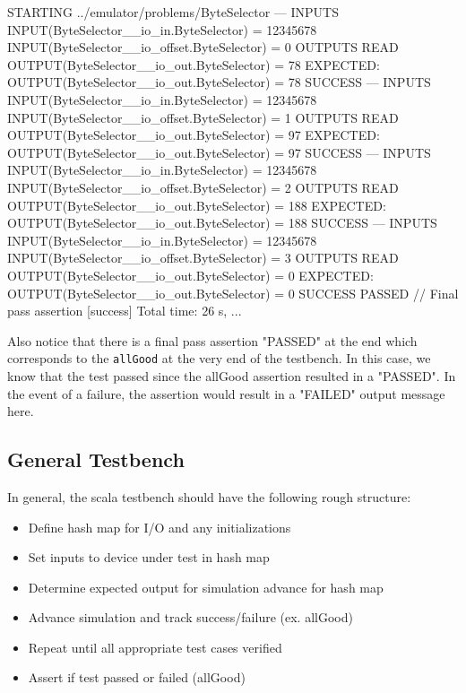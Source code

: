 \documentclass[twocolumn, 10pt]{article}
\begin{document}
\begin{bash}
STARTING ../emulator/problems/ByteSelector
---
INPUTS
  INPUT(ByteSelector__io_in.ByteSelector) = 12345678
  INPUT(ByteSelector__io_offset.ByteSelector) = 0
OUTPUTS
  READ OUTPUT(ByteSelector__io_out.ByteSelector) = 78
  EXPECTED: OUTPUT(ByteSelector__io_out.ByteSelector) = 78
  SUCCESS
---
INPUTS
  INPUT(ByteSelector__io_in.ByteSelector) = 12345678
  INPUT(ByteSelector__io_offset.ByteSelector) = 1
OUTPUTS
  READ OUTPUT(ByteSelector__io_out.ByteSelector) = 97
  EXPECTED: OUTPUT(ByteSelector__io_out.ByteSelector) = 97
  SUCCESS
---
INPUTS
  INPUT(ByteSelector__io_in.ByteSelector) = 12345678
  INPUT(ByteSelector__io_offset.ByteSelector) = 2
OUTPUTS
  READ OUTPUT(ByteSelector__io_out.ByteSelector) = 188
  EXPECTED: OUTPUT(ByteSelector__io_out.ByteSelector) = 188
  SUCCESS
---
INPUTS
  INPUT(ByteSelector__io_in.ByteSelector) = 12345678
  INPUT(ByteSelector__io_offset.ByteSelector) = 3
OUTPUTS
  READ OUTPUT(ByteSelector__io_out.ByteSelector) = 0
  EXPECTED: OUTPUT(ByteSelector__io_out.ByteSelector) = 0
  SUCCESS
PASSED   // Final pass assertion
[success] Total time: 26 s, ...
\end{bash}

Also notice that there is a final pass assertion "PASSED" at the end which corresponds to the \verb+allGood+ at the very end of the testbench. In this case, we know that the test passed since the allGood assertion resulted in a "PASSED". In the event of a failure, the assertion would result in a "FAILED" output message here.

\subsection{General Testbench}

In general, the scala testbench should have the following rough structure:

\begin{itemize}
\item Define hash map for I/O and any initializations
\item Set inputs to device under test in hash map
\item Determine expected output for simulation advance for hash map
\item Advance simulation and track success/failure (ex. allGood)
\item Repeat until all appropriate test cases verified
\item Assert if test passed or failed (allGood)
\end{itemize}
\end{document}
